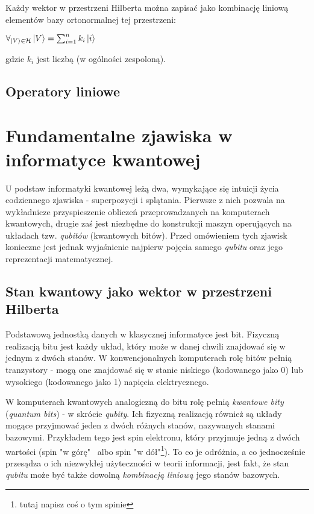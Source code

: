 \documentclass[12pt,a4paper,twoside,openany]{book}
\begin{document}
Każdy wektor w przestrzeni Hilberta można zapisać jako kombinację liniową elementów bazy ortonormalnej tej przestrzeni:
\begin{center}
    $\forall_{\ket{V}\in\mathcal{H}}\ket{V} = \sum_{i=1}^{n}k_{i}\ket{i}$
\end{center}
gdzie $k_{i}$ jest liczbą (w ogólności zespoloną).

\subsection{Operatory liniowe}

\section{Fundamentalne zjawiska w informatyce kwantowej}

U podstaw informatyki kwantowej leżą dwa, wymykające się intuicji życia codziennego zjawiska - superpozycji i splątania. Pierwsze z nich pozwala na wykładnicze przyspieszenie obliczeń przeprowadzanych na komputerach kwantowych, drugie zaś jest niezbędne do konstrukcji maszyn operujących na układach tzw. \textit{qubitów} (kwantowych bitów). Przed omówieniem tych zjawisk konieczne jest jednak wyjaśnienie najpierw pojęcia samego \textit{qubitu} oraz jego reprezentacji matematycznej.

\subsection{Stan kwantowy jako wektor w przestrzeni Hilberta}

Podstawową jednostką danych w klasycznej informatyce jest bit. Fizyczną realizacją bitu jest każdy układ, który może w danej chwili znajdować się w jednym z dwóch stanów. W konwencjonalnych komputerach rolę bitów pełnią tranzystory - mogą one znajdować się w stanie niskiego (kodowanego jako 0) lub wysokiego (kodowanego jako 1) napięcia elektrycznego.

W komputerach kwantowych analogiczną do bitu rolę pełnią \textit{kwantowe bity} (\textit{quantum bits}) - w skrócie \textit{qubity}. Ich fizyczną realizacją również są układy mogące przyjmować jeden z dwóch różnych stanów, nazywanych stanami bazowymi. Przykładem tego jest spin elektronu, który przyjmuje jedną z dwóch wartości (spin "w górę" ~albo spin "w dół"\footnote{tutaj napisz coś o tym spinie}). To co je odróżnia, a co jednocześnie przesądza o ich niezwykłej użyteczności w teorii informacji, jest fakt, że stan \textit{qubitu} może być także dowolną \textit{kombinacją liniową} jego stanów bazowych.
\end{document}
